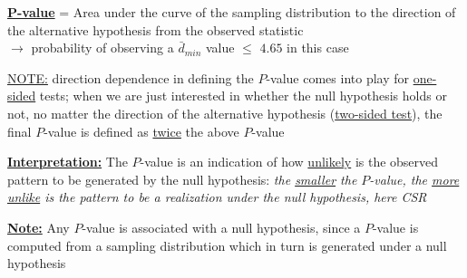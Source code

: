 \documentclass[portrait]{seminar}
\begin{document}
%
%
\begin{slide*}
\begin{center}
 \vspace*{-0.6cm} 
\end{center}
 \vspace{0.1cm}

\begin{center}
\begin{figure}
\hspace{0.3cm}
\end{figure}
\end{center}

\vspace{-0.2cm}\underline{\textbf{P-value}} = Area under the curve
of the sampling distribution to the direction of the alternative
hypothesis from the observed statistic \\
$\longrightarrow$ probability of observing a $\bar{d}_{min}$ value
$\leq$ $4.65$ in this case

{\small \underline{NOTE:} direction dependence in defining the
$P$-value comes into play for \underline{one-sided} tests; when we
are just interested in whether the null hypothesis holds or not, no
matter the direction of the alternative hypothesis
(\underline{two-sided test}), the final $P$-value is defined as
\underline{twice} the above $P$-value}

\vspace{0.2cm}\underline{\textbf{Interpretation:}} The $P$-value is
an indication of how \underline{unlikely} is the observed pattern to
be generated by the null hypothesis: \emph{the \underline{smaller}
the $P$-value, the \underline{more unlike} is the pattern to be a
realization under the null hypothesis, here CSR}

\vspace{0.2cm}\underline{\textbf{Note:}} Any $P$-value is associated
with a null hypothesis, since a $P$-value is computed from a
sampling distribution which in turn is generated under a null
hypothesis

\end{slide*}
\end{document}
